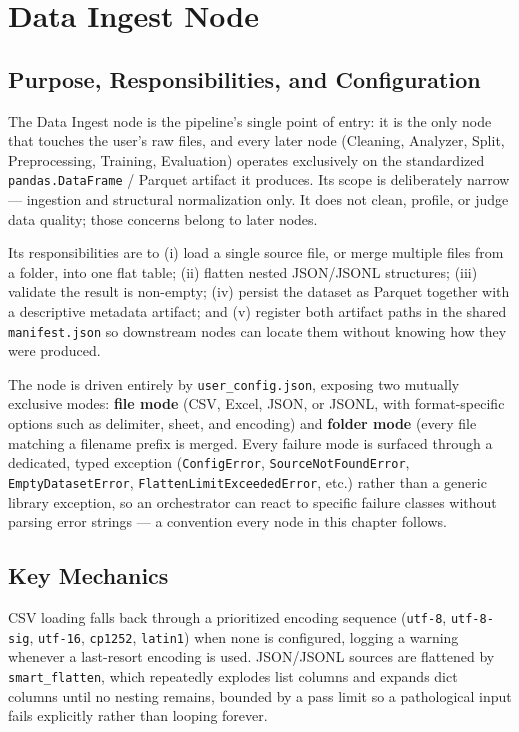 \section{Data Ingest Node}
\label{sec:impl-data-ingest}

\subsection{Purpose, Responsibilities, and Configuration}
\label{subsec:data-ingest-overview}

The Data Ingest node is the pipeline's single point of entry: it is the only node that touches the user's raw files, and every later node (Cleaning, Analyzer, Split, Preprocessing, Training, Evaluation) operates exclusively on the standardized \texttt{pandas.DataFrame} / Parquet artifact it produces. Its scope is deliberately narrow --- ingestion and structural normalization only. It does not clean, profile, or judge data quality; those concerns belong to later nodes.

Its responsibilities are to (i) load a single source file, or merge multiple files from a folder, into one flat table; (ii) flatten nested JSON/JSONL structures; (iii) validate the result is non-empty; (iv) persist the dataset as Parquet together with a descriptive metadata artifact; and (v) register both artifact paths in the shared \texttt{manifest.json} so downstream nodes can locate them without knowing how they were produced.

The node is driven entirely by \texttt{user\_config.json}, exposing two mutually exclusive modes: \textbf{file mode} (CSV, Excel, JSON, or JSONL, with format-specific options such as delimiter, sheet, and encoding) and \textbf{folder mode} (every file matching a filename prefix is merged. Every failure mode is surfaced through a dedicated, typed exception (\texttt{ConfigError}, \texttt{SourceNotFoundError}, \texttt{EmptyDatasetError}, \texttt{FlattenLimitExceededError}, etc.) rather than a generic library exception, so an orchestrator can react to specific failure classes without parsing error strings --- a convention every node in this chapter follows.

\subsection{Key Mechanics}
\label{subsec:data-ingest-mechanics}

CSV loading falls back through a prioritized encoding sequence (\texttt{utf-8}, \texttt{utf-8-sig}, \texttt{utf-16}, \texttt{cp1252}, \texttt{latin1}) when none is configured, logging a warning whenever a last-resort encoding is used. JSON/JSONL sources are flattened by \texttt{smart\_flatten}, which repeatedly explodes list columns and expands dict columns until no nesting remains, bounded by a pass limit so a pathological input fails explicitly rather than looping forever.

